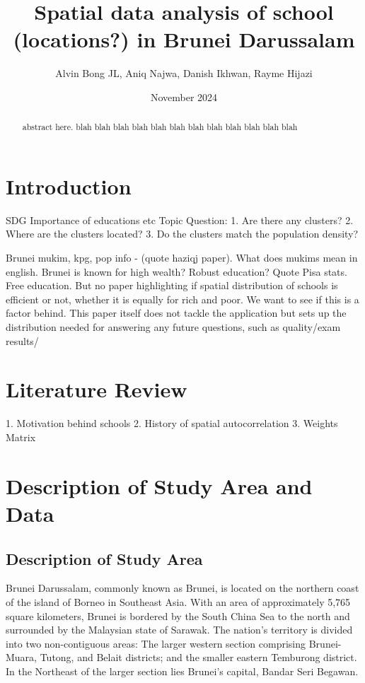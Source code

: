 \documentclass[12pt]{article}
\title{Spatial data analysis of school (locations?) in Brunei Darussalam }
\author{Alvin Bong JL, Aniq Najwa, Danish Ikhwan, Rayme Hijazi}
\date{November 2024}
\begin{document}
\maketitle
\begin{abstract}
    abstract here. blah blah blah blah blah blah blah blah blah blah blah blah
\end{abstract}


\section{Introduction}
SDG
Importance of educations etc
Topic Question:
	1. Are there any clusters?
	2. Where are the clusters located?
	3. Do the clusters match the population density?

Brunei mukim, kpg, pop info -  (quote haziqj paper). What does mukims mean in english.
Brunei is known for high wealth? Robust education? Quote Pisa stats. Free education. But no paper highlighting if spatial distribution of schools is efficient or not, whether it is equally for rich and poor. We want to see if this is a factor behind. This paper itself does not tackle the application but sets up the distribution needed for answering any future questions, such as quality/exam results/

\section{Literature Review}
1. Motivation behind schools
2. History of spatial autocorrelation
3. Weights Matrix



\section{Description of Study Area and Data}
\subsection{Description of Study Area}
Brunei Darussalam, commonly known as Brunei, is located on the northern coast of the island of Borneo in Southeast Asia. With an area of approximately 5,765 square kilometers, Brunei is bordered by the South China Sea to the north and surrounded by the Malaysian state of Sarawak. The nation’s territory is divided into two non-contiguous areas:  The larger western section comprising Brunei-Muara, Tutong, and Belait districts; and the smaller eastern Temburong district. In the Northeast of the larger section lies Brunei's capital, Bandar Seri Begawan. \\
\end{document}
